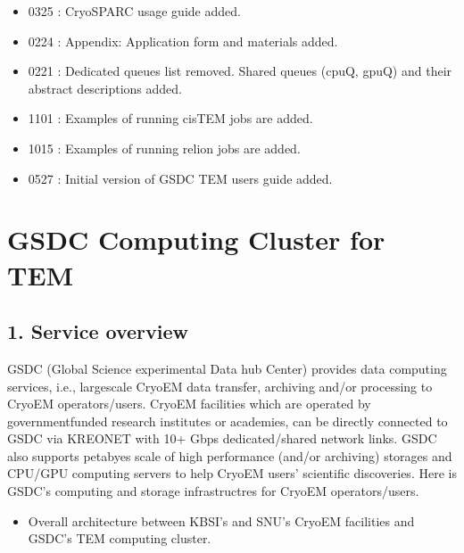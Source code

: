 \documentclass[a4paper,10pt,english]{sphinxmanual}
\begin{document}
\begin{itemize}
\item {} 
\sphinxhyphen{}03\sphinxhyphen{}25 : CryoSPARC usage guide added.

\item {} 
\sphinxhyphen{}02\sphinxhyphen{}24 : Appendix: Application form and materials added.

\item {} 
\sphinxhyphen{}02\sphinxhyphen{}21 : Dedicated queues list removed. Shared queues (cpuQ, gpuQ) and their abstract descriptions added.

\item {} 
\sphinxhyphen{}11\sphinxhyphen{}01 : Examples of running cisTEM jobs are added.

\item {} 
\sphinxhyphen{}10\sphinxhyphen{}15 : Examples of running relion jobs are added.

\item {} 
\sphinxhyphen{}05\sphinxhyphen{}27 : Initial version of GSDC TEM users guide added.

\end{itemize}

\sphinxstepscope


\chapter{GSDC Computing Cluster for TEM}
\label{\detokenize{newfarm:gsdc-computing-cluster-for-tem}}\label{\detokenize{newfarm::doc}}

\section{1. Service overview}
\label{\detokenize{newfarm:service-overview}}\label{\detokenize{newfarm:id1}}
\sphinxAtStartPar
GSDC (Global Science experimental Data hub Center) provides data computing services, i.e., large\sphinxhyphen{}scale Cryo\sphinxhyphen{}EM data transfer, archiving and/or processing to Cryo\sphinxhyphen{}EM operators/users.
Cryo\sphinxhyphen{}EM facilities which are operated by government\sphinxhyphen{}funded research institutes or academies, can be directly connected to GSDC via KREONET with 10+ Gbps dedicated/shared network links.
GSDC also supports petabyes scale of high performance (and/or archiving) storages and CPU/GPU computing servers to help Cryo\sphinxhyphen{}EM users’ scientific discoveries.
Here is GSDC’s computing and storage infrastructres for Cryo\sphinxhyphen{}EM operators/users.
\begin{itemize}
\item {} 
\sphinxAtStartPar
Overall architecture between KBSI’s and SNU’s Cryo\sphinxhyphen{}EM facilities and GSDC’s TEM computing cluster.

\end{itemize}
\end{document}
